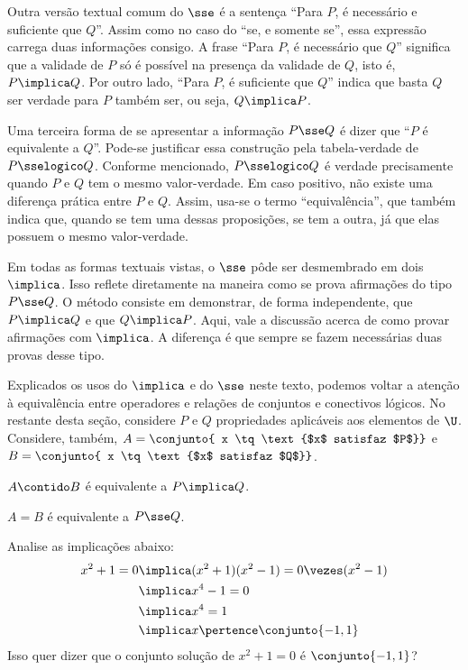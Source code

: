 Outra versão textual comum do $\sse$ é a sentença ``Para $P$, é necessário e suficiente que $Q$''. Assim como no caso do ``se, e somente se'', essa expressão carrega duas informações consigo. A frase ``Para $P$, é necessário que $Q$'' significa que a validade de $P$ só é possível na presença da validade de $Q$, isto é, $P \implica Q$. Por outro lado, ``Para $P$, é suficiente que $Q$'' indica que basta $Q$ ser verdade para $P$ também ser, ou seja, $Q \implica P$.

Uma terceira forma de se apresentar a informação $P \sse Q$ é dizer que ``$P$ é equivalente a $Q$''. Pode-se justificar essa construção pela tabela-verdade de $P \sselogico Q$. Conforme mencionado, $P \sselogico Q$ é verdade precisamente quando $P$ e $Q$ tem o mesmo valor-verdade. Em caso positivo, não existe uma diferença prática entre $P$ e $Q$. Assim, usa-se o termo ``equivalência'', que também indica que, quando se tem uma dessas proposições, se tem a outra, já que elas possuem o mesmo valor-verdade.

Em todas as formas textuais vistas, o $\sse$ pôde ser desmembrado em dois $\implica$. Isso reflete diretamente na maneira como se prova afirmações do tipo $P \sse Q$. O método consiste em demonstrar, de forma independente, que $P \implica Q$ e que $Q \implica P$. Aqui, vale a discussão acerca de como provar afirmações com $\implica$. A diferença é que sempre se fazem necessárias duas provas desse tipo.

Explicados os usos do $\implica$  e do $\sse$ neste texto, podemos voltar a atenção à equivalência entre operadores e relações de conjuntos e conectivos lógicos. No restante desta seção, considere $P$ e $Q$ propriedades aplicáveis aos elementos de $\U$. Considere, também, $A = \conjunto{ x \tq \text{$x$ satisfaz $P$}}$ e $B = \conjunto{ x \tq \text{$x$ satisfaz $Q$}}$.

\begin{proposition} 
	$A \contido B$ é equivalente a $P \implica Q$.
\end{proposition}

\begin{proposition} 
	$A = B$ é equivalente a $P \sse Q$.
\end{proposition}

\begin{example}
	Analise as implicações abaixo:
	\begin{align*}
        x^2+1=0 &\implica (x^2+1)(x^2-1) = 0 \vezes (x^2-1) \\
                &\implica x^4 - 1 = 0 \\
                &\implica x^4 = 1 \\
                &\implica x \pertence \conjunto {-1, 1}
	\end{align*}
	Isso quer dizer que o conjunto solução de $x^2 +1 = 0$ é $\conjunto{-1, 1}$?
\end{example}

